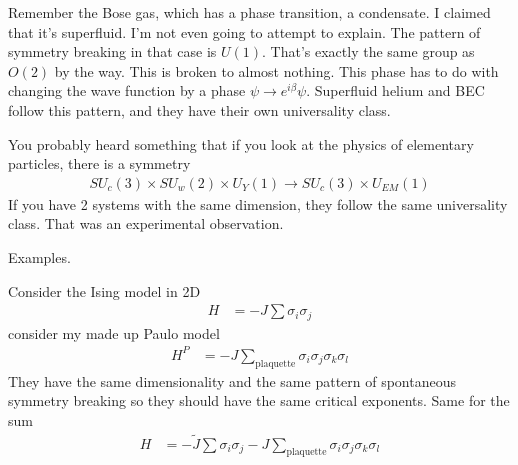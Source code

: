 Remember the Bose gas,
which has a phase transition,
a condensate.
I claimed that it's superfluid.
I'm not even going to attempt to explain.
The pattern of symmetry breaking in that case is $U(1)$.
That's exactly the same group as $O(2)$ by the way.
This is broken to almost nothing.
This phase has to do with changing the wave function by a phase
$\psi \to e^{i\beta} \psi$.
Superfluid helium and BEC follow this pattern,
and they have their own universality class.

You probably heard something that if you look at the physics of elementary
particles,
there is a symmetry
\begin{align}
    SU_c(3)
    \times
    SU_w(2)
    \times
    U_Y(1)
    \to
    SU_c(3)
    \times
    U_{EM}(1)
\end{align}
If you have 2 systems with the same dimension,
they follow the same universality class.
That was an experimental observation.

Examples.

Consider the Ising model in 2D
\begin{align}
    H &=
    -J \sum \sigma_i \sigma_j
\end{align}
consider my made up Paulo model
\begin{align}
    H^P &=
    -J \sum_{\textrm{plaquette}}
    \sigma_{i} \sigma_{j} \sigma_{k} \sigma_{l}
\end{align}
They have the same dimensionality and the same pattern of spontaneous symmetry
breaking so they should have the same critical exponents.
Same for the sum
\begin{align}
    H &=
    -\tilde{J} \sum \sigma_i \sigma_j
    -J \sum_{\textrm{plaquette}}
    \sigma_{i} \sigma_{j} \sigma_{k} \sigma_{l}
\end{align}
